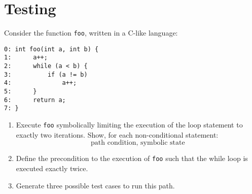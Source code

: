 \section{Testing}

Consider the function \texttt{foo}, written in a C-like language:
\begin{lstlisting}[style=C]
0: int foo(int a, int b) { 
1:      a++;
2:      while (a < b) {
3:          if (a != b)
4:              a++; 
5:      }
6:      return a;
7: }
\end{lstlisting}
\begin{enumerate}
    \item Execute \texttt{foo} symbolically limiting the execution of the loop statement to exactly two iterations. 
        Show, for each non-conditional statement:
        \[\text{path condition, symbolic state}\]
    \item Define the precondition to the execution of \texttt{foo} such that the while loop is executed exactly twice. 
    \item Generate three possible test cases to run this path. 
\end{enumerate}

